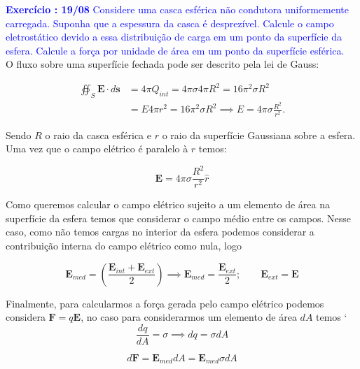 \textcolor{blue}{\textbf{Exercício \paragraphnum: 19/08 }
	Considere uma casca esférica não condutora uniformemente carregada. Suponha que a espessura da casca é desprezível. Calcule o campo eletrostático devido a essa distribuição de carga em um ponto da superfície da esfera. Calcule a força por unidade de área em um ponto da superfície esférica.}
\bigskip\\


O fluxo sobre uma superfície fechada pode ser descrito pela lei de Gauss:

\begin{equation}
	\begin{split}
		\oiint_S \textbf{E}\cdot d\textbf{s} & = 4\pi Q_{int} = 4\pi \sigma 4 \pi R^2 = 16\pi^2\sigma R^2 \\
		& = E4\pi r^2 = 16\pi^2\sigma R^2 \implies E = 4\pi\sigma\frac{R^2}{r^2}.
	\end{split}
\end{equation}

Sendo $R$ o raio da casca esférica e $r$ o raio da superfície Gaussiana sobre a esfera. Uma vez que o campo elétrico é paralelo à $r$ temos:

\begin{equation}
	\textbf{E} = 4\pi\sigma\frac{R^2}{r^2}\hat{r}
	\label{eq1:campo}
\end{equation}

Como queremos calcular o campo elétrico sujeito a um elemento de área na superfície da esfera temos que considerar o campo médio entre os campos. Nesse caso, como não temos cargas no interior da esfera podemos considerar a contribuição interna do campo elétrico como nula, logo

\begin{equation}
	\textbf{E}_{med} = \left( \frac{\textbf{E}_{int} + \textbf{E}_{ext}}{2}\right) \implies \textbf{E}_{med} = \frac{\textbf{E}_{ext}}{2}; \qquad \textbf{E}_{ext} = \textbf{E}
	\label{eq1:campo_medio}
\end{equation}

Finalmente, para calcularmos a força gerada pelo campo elétrico podemos considera $\textbf{F} = q\textbf{E}$, no caso para considerarmos um elemento de área $dA$ temos
`
\begin{equation}
	\frac{dq}{dA} = \sigma \implies dq = \sigma dA
\end{equation}

\begin{equation}
	d \textbf{F} = \textbf{E}_{med} dA = \textbf{E}_{med} \sigma dA 
	\label{eq1:elemento_forca}
\end{equation}

